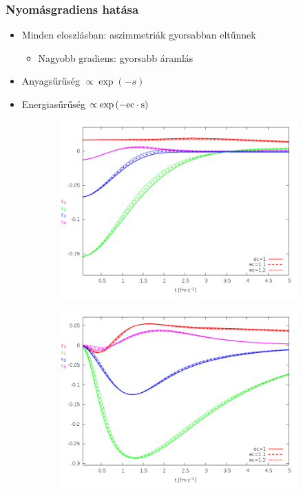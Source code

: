\documentclass{beamer}
\begin{document}
\begin{frame}
\frametitle{Nyomásgradiens hatása}
\begin{center}
\begin{itemize}
\setlength{\itemsep}{12pt}
\item<1-> Minden eloszlásban: aszimmetriák gyorsabban eltűnnek
\begin{itemize}
\vspace{8pt}
\item<1-> Nagyobb gradiens: gyorsabb áramlás
\end{itemize}
\item<1-> Anyagsűrűség $\propto \exp{(-s)}$
\item<1-> Energiasűrűség $\propto \exp{(-\rm{ec}\cdot s)}$
\end{itemize}
\begin{figure}[H]
	\centering
    \begin{subfigure}[b]{0.49\textwidth}
    		\includegraphics[width=\textwidth]{pic/res/nonrel/eps_ec_r}
	\end{subfigure}
	\begin{subfigure}[b]{0.49\textwidth}
        	\includegraphics[width=\textwidth]{pic/res/nonrel/eps_ec_v}
	\end{subfigure}
\end{figure}
\end{center}
\end{frame}
\end{document}
